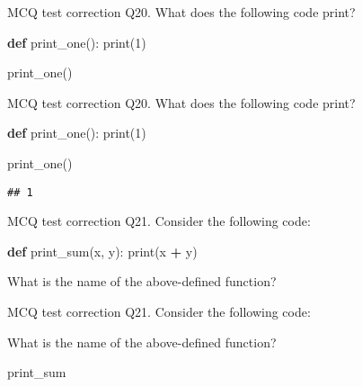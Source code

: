\documentclass[
  8pt,
  ignorenonframetext,
]{beamer}
\newenvironment{Shaded}{\begin{snugshade}}{\end{snugshade}}
\newcommand{\BuiltInTok}[1]{#1}
\newcommand{\DecValTok}[1]{\textcolor[rgb]{0.00,0.00,0.81}{#1}}
\newcommand{\KeywordTok}[1]{\textcolor[rgb]{0.13,0.29,0.53}{\textbf{#1}}}
\newcommand{\NormalTok}[1]{#1}
\newcommand{\OperatorTok}[1]{\textcolor[rgb]{0.81,0.36,0.00}{\textbf{#1}}}
\begin{document}
\begin{frame}[fragile]{MCQ test correction}
\protect\hypertarget{mcq-test-correction-38}{}
Q20. What does the following code print?

\begin{Shaded}
\begin{Highlighting}[]
\KeywordTok{def}\NormalTok{ print\_one():}
    \BuiltInTok{print}\NormalTok{(}\DecValTok{1}\NormalTok{)}

\NormalTok{print\_one()}
\end{Highlighting}
\end{Shaded}
\end{frame}

\begin{frame}[fragile]{MCQ test correction}
\protect\hypertarget{mcq-test-correction-39}{}
Q20. What does the following code print?

\begin{Shaded}
\begin{Highlighting}[]
\KeywordTok{def}\NormalTok{ print\_one():}
    \BuiltInTok{print}\NormalTok{(}\DecValTok{1}\NormalTok{)}

\NormalTok{print\_one()}
\end{Highlighting}
\end{Shaded}

\begin{verbatim}
## 1
\end{verbatim}
\end{frame}

\begin{frame}[fragile]{MCQ test correction}
\protect\hypertarget{mcq-test-correction-40}{}
Q21. Consider the following code:

\begin{Shaded}
\begin{Highlighting}[]
\KeywordTok{def}\NormalTok{ print\_sum(x, y):}
    \BuiltInTok{print}\NormalTok{(x }\OperatorTok{+}\NormalTok{ y)}
\end{Highlighting}
\end{Shaded}

What is the name of the above-defined function?
\end{frame}

\begin{frame}{MCQ test correction}
\protect\hypertarget{mcq-test-correction-41}{}
Q21. Consider the following code:

What is the name of the above-defined function?

print\_sum
\end{frame}
\end{document}
